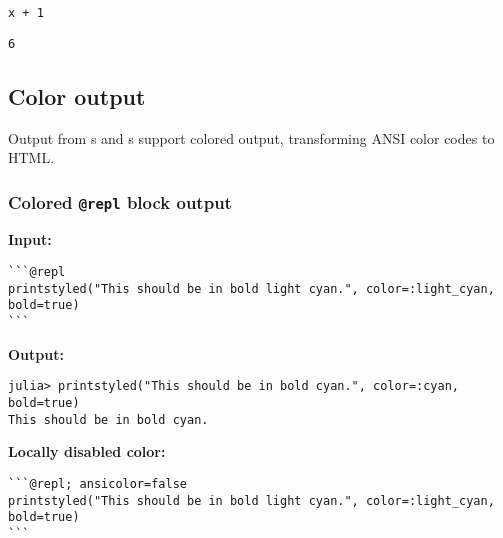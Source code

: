 \begin{verbatim}
x + 1
\end{verbatim}


\begin{verbatim}
6
\end{verbatim}



\subsection{Color output}



\label{17347250707405175741}{}


Output from s and s support colored output, transforming ANSI color codes to HTML.



\subsubsection{Colored \texttt{@repl} block output}



\label{681009610151884915}{}


\textbf{Input:}




\begin{verbatim}
```@repl
printstyled("This should be in bold light cyan.", color=:light_cyan, bold=true)
```
\end{verbatim}



\textbf{Output:}




\begin{verbatim}
julia> printstyled("This should be in bold cyan.", color=:cyan, bold=true)
This should be in bold cyan.
\end{verbatim}



\textbf{Locally disabled color:}




\begin{verbatim}
```@repl; ansicolor=false
printstyled("This should be in bold light cyan.", color=:light_cyan, bold=true)
```
\end{verbatim}




